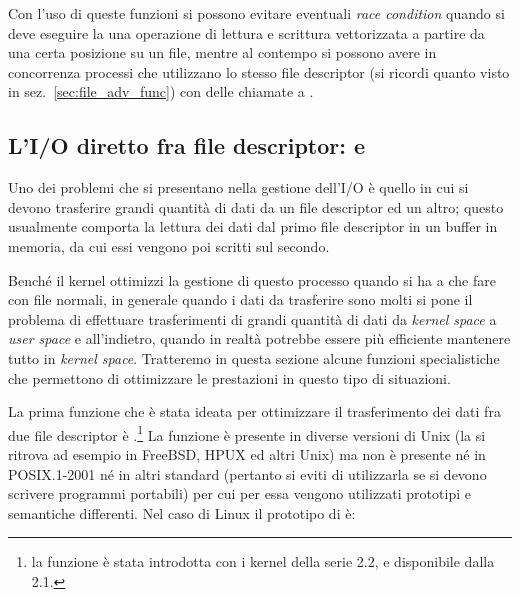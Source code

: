 Con l'uso di queste funzioni si possono evitare eventuali \textit{race
  condition} quando si deve eseguire la una operazione di lettura e scrittura
vettorizzata a partire da una certa posizione su un file, mentre al contempo
si possono avere in concorrenza processi che utilizzano lo stesso file
descriptor (si ricordi quanto visto in sez.~\ref{sec:file_adv_func}) con delle
chiamate a .



\subsection{L'I/O diretto fra file descriptor:  e
  } 
\label{sec:file_sendfile_splice}

Uno dei problemi che si presentano nella gestione dell'I/O è quello in cui si
devono trasferire grandi quantità di dati da un file descriptor ed un altro;
questo usualmente comporta la lettura dei dati dal primo file descriptor in un
buffer in memoria, da cui essi vengono poi scritti sul secondo.

Benché il kernel ottimizzi la gestione di questo processo quando si ha a che
fare con file normali, in generale quando i dati da trasferire sono molti si
pone il problema di effettuare trasferimenti di grandi quantità di dati da
\textit{kernel space} a \textit{user space} e all'indietro, quando in realtà
potrebbe essere più efficiente mantenere tutto in \textit{kernel
  space}. Tratteremo in questa sezione alcune funzioni specialistiche che
permettono di ottimizzare le prestazioni in questo tipo di situazioni.

La prima funzione che è stata ideata per ottimizzare il trasferimento dei dati
fra due file descriptor è .\footnote{la funzione è stata
  introdotta con i kernel della serie 2.2, e disponibile dalla 
  2.1.} La funzione è presente in diverse versioni di Unix (la si ritrova ad
esempio in FreeBSD, HPUX ed altri Unix) ma non è presente né in POSIX.1-2001
né in altri standard (pertanto si eviti di utilizzarla se si devono scrivere
programmi portabili) per cui per essa vengono utilizzati prototipi e
semantiche differenti. Nel caso di Linux il prototipo di  è:


